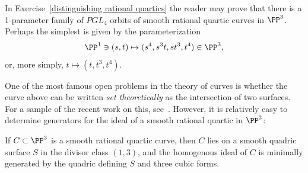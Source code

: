 \begin{example}
In Exercise~\ref{distinguishing rational quartics} the reader may prove that there is a 1-parameter family of 
$PGL_4$ orbits of smooth rational quartic curves in $\PP^3$. Perhaps the simplest is given by the parameterization 
$$
\PP^1 \ni (s,t) \mapsto (s^4, s^3t, st^3, t^4)\in \PP^3,
$$
or, more simply, $t\mapsto(t, t^3, t^4)$. 
\end{example}


One of the most famous open problems in the theory of curves is whether the curve above
can be written \emph{set theoretically} as the intersection of two surfaces. For a sample of the recent
work on this, see~\cite{MR3356940}. However, it is relatively easy to determine generators for the
ideal of a smooth rational quartic in $\PP^3$:


\begin{proposition}\label{ideal of rational quartic}
If $C\subset \PP^3$ is a smooth rational quartic curve, then $C$ lies on a smooth quadric
surface $S$ in the divisor class $(1,3)$, and the homogenous ideal of $C$ is minimally
generated by the quadric defining $S$ and three cubic forms.
\end{proposition}

